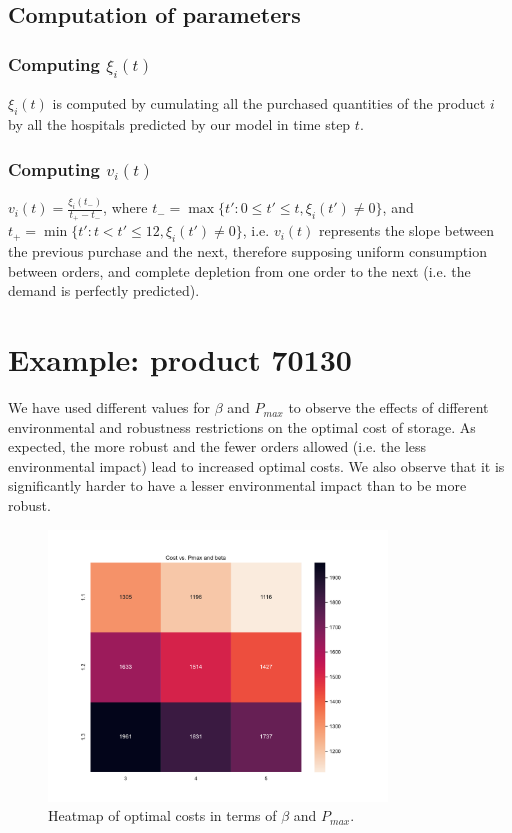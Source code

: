 \documentclass[11pt,twocolumn]{article}
\begin{document}
\subsection{Computation of parameters}
\subsubsection{Computing $\xi_i(t)$}
$\xi_i(t)$ is computed by cumulating all the purchased quantities of the product $i$ by all the hospitals predicted by our model in time step $t$.

\subsubsection{Computing $v_i(t)$}
$v_i(t)=\frac{\xi_i(t_-)}{t_+-t_-}$, where $t_-=\max\{t': 0\leq t'\leq t, \xi_i(t') \neq 0\}$, and $t_+=\min\{t':t<t'\leq 12, \xi_i(t')\neq 0\}$, i.e. $v_i(t)$ represents the slope between the previous purchase and the next, therefore supposing uniform consumption between orders, and complete depletion from one order to the next (i.e. the demand is perfectly predicted).


\section{Example: product 70130}

We have used different values for $\beta$ and $P_{max}$ to observe the effects of different environmental and robustness restrictions on the optimal cost of storage. As expected, the more robust and the fewer orders allowed (i.e. the less environmental impact) lead to increased optimal costs. We also observe that it is significantly harder to have a lesser environmental impact than to be more robust.

\begin{figure}[ht]
	\centering
	\includegraphics[width=9cm]{heatmap.pdf}
	\caption{Heatmap of optimal costs in terms of $\beta$ and $P_{max}$.}
	\label{fig:enter-label2}
\end{figure}
\end{document}
